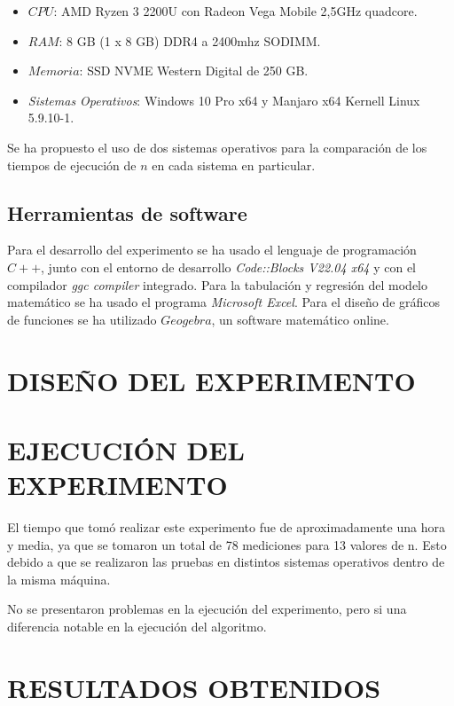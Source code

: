 \documentclass[11pt, twocolumn]{llncs}
\begin{document}
\begin{itemize}
    \item $CPU$: AMD Ryzen 3 2200U con Radeon Vega Mobile 2,5GHz quadcore.
    \item $RAM$: 8 GB (1 x 8 GB) DDR4 a 2400mhz SODIMM.
    \item $Memoria$: SSD NVME Western Digital de 250 GB.
    \item \textit{Sistemas Operativos}: Windows 10 Pro x64 y Manjaro x64 Kernell Linux 5.9.10-1.
\end{itemize}

Se ha propuesto el uso de dos sistemas operativos para la comparación de los tiempos de ejecución de $n$ en cada sistema en particular.

\subsection{Herramientas de software}
Para el desarrollo del experimento se ha usado el lenguaje de programación $C++$, junto con el entorno de desarrollo \textit{Code::Blocks V22.04 x64} y con el compilador \textit{ggc compiler} integrado. Para la tabulación y regresión del modelo matemático se ha usado el programa \textit{Microsoft Excel}. Para el diseño de gráficos de funciones se ha utilizado $Geogebra$, un software matemático online.

\section{DISEÑO DEL EXPERIMENTO}\label{diseño}


\section{EJECUCIÓN DEL EXPERIMENTO}\label{ejecucion}
El tiempo que tomó realizar este experimento
fue de aproximadamente una hora y media,
ya que se tomaron un total de 78 mediciones
para 13 valores de n. Esto debido a que se realizaron las pruebas en distintos sistemas operativos dentro de la misma máquina.

No se presentaron problemas en la ejecución del experimento, pero si una diferencia notable en la ejecución del algoritmo.

\section{RESULTADOS OBTENIDOS}\label{resultados}


\end{document}
